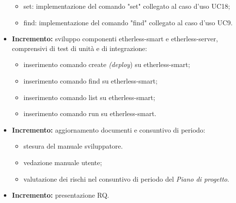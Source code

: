\begin{itemize}
\begin{itemize}
    \item set: implementazione del comando "set" collegato al caso d'uso UC18;
    \item find: implementazione del comando "find" collegato al caso d'uso UC9.
  \end{itemize}
	\item \textbf{ Incremento:} sviluppo componenti etherless-smart e etherless-server, comprensivi di test di unità e di integrazione:
	\begin{itemize}
		\item inserimento comando create \textit{(deploy}\glo) su etherless-smart;
		\item inserimento comando find su etherless-smart;
		\item inserimento comando list su etherless-smart;
		\item inserimento comando run su etherless-smart.
	\end{itemize}
	\item \textbf{ Incremento:} aggiornamento documenti e consuntivo di periodo:
  \begin{itemize}
  	\item stesura del manuale sviluppatore.
    \item vedazione manuale utente;
    \item valutazione dei rischi nel consuntivo di periodo del \textit{Piano di progetto}\docs.
  \end{itemize}
	\item \textbf{ Incremento:} presentazione RQ.
\end{itemize}

